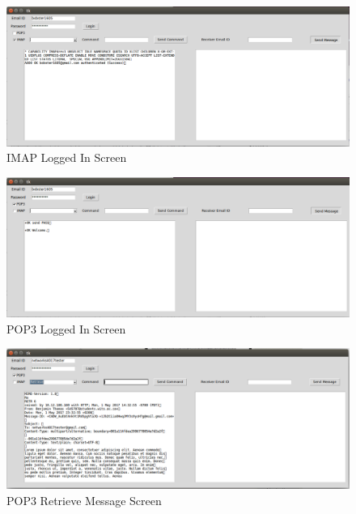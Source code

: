 \documentclass[11pt]{article}
\begin{document}
\begin{figure}[h]
\centering
\caption{IMAP Logged In Screen}
\includegraphics[scale=0.7]{images/IMAPloggedIn.png}
\end{figure}

\begin{figure}[!htb]
\centering
\caption{POP3 Logged In Screen}
\includegraphics[scale=0.7]{images/POP3loggedIN.png}
\end{figure}

\begin{figure}[!htb]
\centering
\caption{POP3 Retrieve Message Screen}
\includegraphics[scale=0.45]{images/receivedEmail.png}
\end{figure}

\newpage
\clearpage
\end{document}

